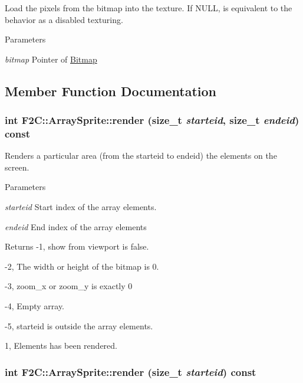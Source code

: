 Load the pixels from the bitmap into the texture. If NULL, is equivalent to the behavior as a disabled texturing. 
\begin{DoxyParams}{Parameters}
\item[{\em bitmap}]Pointer of \hyperlink{class_f2_c_1_1_bitmap}{Bitmap} \end{DoxyParams}


\subsection{Member Function Documentation}
\hypertarget{class_f2_c_1_1_array_sprite_a76b3b457b6fdabffc841b718d52078af}{
\subsubsection[{render}]{\setlength{\rightskip}{0pt plus 5cm}int F2C::ArraySprite::render (size\_\-t {\em starteid}, \/  size\_\-t {\em endeid}) const}}
\label{class_f2_c_1_1_array_sprite_a76b3b457b6fdabffc841b718d52078af}


Renders a particular area (from the starteid to endeid) the elements on the screen. 
\begin{DoxyParams}{Parameters}
\item[{\em starteid}]Start index of the array elements. \item[{\em endeid}]End index of the array elements \end{DoxyParams}
\begin{DoxyReturn}{Returns}
-\/1, show from viewport is false. 

-\/2, The width or height of the bitmap is 0. 

-\/3, zoom\_\-x or zoom\_\-y is exactly 0 

-\/4, Empty array. 

-\/5, starteid is outside the array elements. 

1, Elements has been rendered. 
\end{DoxyReturn}
\hypertarget{class_f2_c_1_1_array_sprite_a7324125437c987b7fe0965f76deca762}{
\subsubsection[{render}]{\setlength{\rightskip}{0pt plus 5cm}int F2C::ArraySprite::render (size\_\-t {\em starteid}) const}}
\label{class_f2_c_1_1_array_sprite_a7324125437c987b7fe0965f76deca762}


